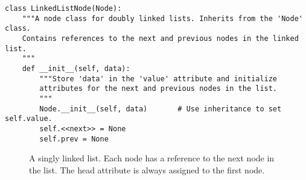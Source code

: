 \begin{lstlisting}
class LinkedListNode(Node):
    """A node class for doubly linked lists. Inherits from the 'Node' class.
    Contains references to the next and previous nodes in the linked list.
    """
    def __init__(self, data):
        """Store 'data' in the 'value' attribute and initialize
        attributes for the next and previous nodes in the list.
        """
        Node.__init__(self, data)       # Use inheritance to set self.value.
        self.<<next>> = None
        self.prev = None
\end{lstlisting}

\begin{figure} %
\centering
{}
\caption{A singly linked list. Each node has a reference to the next node in the list. The head attribute is always assigned to the first node.}
\label{fig:singly_linked}
\end{figure}

